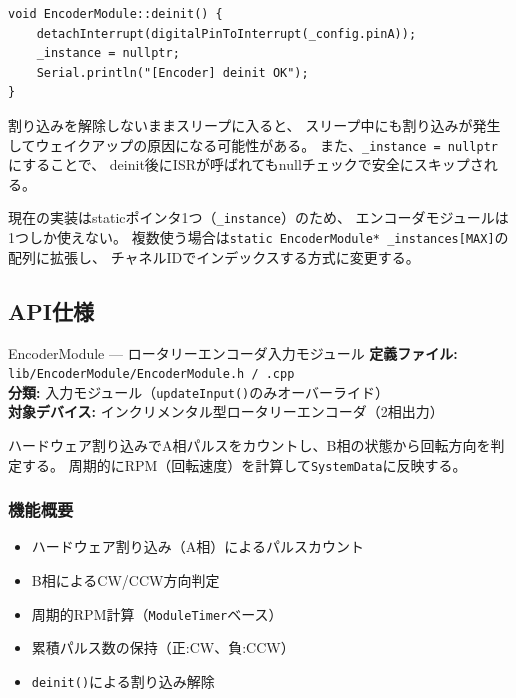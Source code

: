 \begin{lstlisting}[style=cppstyle, caption={EncoderModule.cpp — deinit()}]
void EncoderModule::deinit() {
    detachInterrupt(digitalPinToInterrupt(_config.pinA));
    _instance = nullptr;
    Serial.println("[Encoder] deinit OK");
}
\end{lstlisting}

\begin{pointbox}[割り込み解除の重要性]
割り込みを解除しないままスリープに入ると、
スリープ中にも割り込みが発生してウェイクアップの原因になる可能性がある。
また、\texttt{\_instance = nullptr}にすることで、
deinit後にISRが呼ばれてもnullチェックで安全にスキップされる。
\end{pointbox}

\begin{notebox}[複数インスタンスへの拡張]
現在の実装はstaticポインタ1つ（\texttt{\_instance}）のため、
エンコーダモジュールは1つしか使えない。
複数使う場合は\texttt{static EncoderModule* \_instances[MAX]}の配列に拡張し、
チャネルIDでインデックスする方式に変更する。
\end{notebox}

\subsection{API仕様}


\begin{apibox}{EncoderModule --- ロータリーエンコーダ入力モジュール}
\textbf{定義ファイル:} \texttt{lib/EncoderModule/EncoderModule.h / .cpp}\\
\textbf{分類:} 入力モジュール（\texttt{updateInput()}のみオーバーライド）\\
\textbf{対象デバイス:} インクリメンタル型ロータリーエンコーダ（2相出力）

ハードウェア割り込みでA相パルスをカウントし、B相の状態から回転方向を判定する。
周期的にRPM（回転速度）を計算して\texttt{SystemData}に反映する。
\end{apibox}

\subsubsection{機能概要}

\begin{itemize}
    \item ハードウェア割り込み（A相）によるパルスカウント
    \item B相によるCW/CCW方向判定
    \item 周期的RPM計算（\texttt{ModuleTimer}ベース）
    \item 累積パルス数の保持（正:CW、負:CCW）
    \item \texttt{deinit()}による割り込み解除
\end{itemize}


